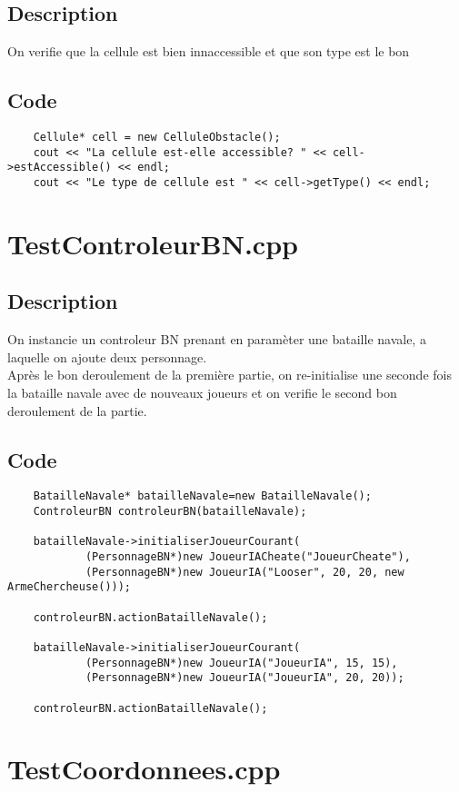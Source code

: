         \subsection{Description}
            On verifie que la cellule est bien innaccessible et que son type est le bon
        \subsection{Code}
\begin{lstlisting}
	Cellule* cell = new CelluleObstacle();
	cout << "La cellule est-elle accessible? " << cell->estAccessible() << endl;
	cout << "Le type de cellule est " << cell->getType() << endl;
	\end{lstlisting}
    \section{TestControleurBN.cpp}
        \subsection{Description}
            On instancie un controleur BN prenant en paramèter une bataille navale, a laquelle on ajoute deux personnage.\\
            Après le bon deroulement de la première partie, on re-initialise une seconde fois la bataille navale avec de nouveaux joueurs et on verifie le second bon deroulement de la partie.
        \subsection{Code}
\begin{lstlisting}
	BatailleNavale* batailleNavale=new BatailleNavale();
    ControleurBN controleurBN(batailleNavale);

    batailleNavale->initialiserJoueurCourant(
            (PersonnageBN*)new JoueurIACheate("JoueurCheate"),
            (PersonnageBN*)new JoueurIA("Looser", 20, 20, new ArmeChercheuse()));

    controleurBN.actionBatailleNavale();

    batailleNavale->initialiserJoueurCourant(
            (PersonnageBN*)new JoueurIA("JoueurIA", 15, 15),
            (PersonnageBN*)new JoueurIA("JoueurIA", 20, 20));

    controleurBN.actionBatailleNavale();
	\end{lstlisting}
    \section{TestCoordonnees.cpp}
